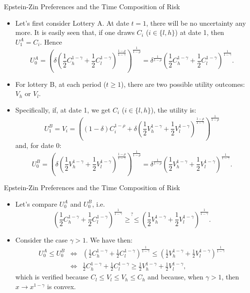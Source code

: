 \begin{frame}{Epstein-Zin Preferences and the Time Composition of Risk}
\begin{scriptsize}
\begin{itemize}
	\item Let's first consider Lottery A. At date $t=1$, there will be no uncertainty any more. It is easily seen that, if one draws $C_i$ ($i \in \{l,h\}$) at date 1, then $U_1^A = C_i$. Hence
	\begin{equation}\label{eq:U0A}
	U_0^A =  \left(\delta \left(\frac{1}{2}C_h^{1-\gamma}+\frac{1}{2}C_l^{1-\gamma}\right)^{\frac{1-\rho}{1-\gamma}}\right)^{\frac{1}{1-\rho}}= \delta^{\frac{1}{1-\rho}} \left(\frac{1}{2}C_h^{1-\gamma}+\frac{1}{2}C_l^{1-\gamma}\right)^{\frac{1}{1-\gamma}}.
	\end{equation}
	\item For lottery B, at each period ($t\ge1$), there are two possible utility outcomes: $V_h$ or $V_l$.
	\item Specifically, if, at date 1, we get $C_i$ ($i \in \{l,h\}$), the utility is:
	\begin{equation}\label{eq:ABCD}
	U_1^B = V_i = \left((1-\delta)C_i^{1-\rho} + \delta \left(\frac{1}{2}V_h^{1-\gamma}+\frac{1}{2}V_l^{1-\gamma}\right)^{\frac{1-\rho}{1-\gamma}}\right)^{\frac{1}{1-\rho}}
	\end{equation}
	and, for date 0:
	$$
	U_0^B =  \left(\delta \left(\frac{1}{2}V_h^{1-\gamma}+\frac{1}{2}V_l^{1-\gamma}\right)^{\frac{1-\rho}{1-\gamma}}\right)^{\frac{1}{1-\rho}}= \delta^{\frac{1}{1-\rho}}\left(\frac{1}{2}V_h^{1-\gamma}+\frac{1}{2}V_l^{1-\gamma}\right)^{\frac{1}{1-\gamma}}.
	$$
\end{itemize}
\end{scriptsize}
\end{frame}

\begin{frame}{Epstein-Zin Preferences and the Time Composition of Risk}
\begin{scriptsize}
\begin{itemize}
	\item Let's compare $U_0^A$ and $U_0^B$, i.e.
	$$
	\left(\frac{1}{2}C_h^{1-\gamma}+\frac{1}{2}C_l^{1-\gamma}\right)^{\frac{1}{1-\gamma}}
	\overset{?}{\ge \le}
	\left(\frac{1}{2}V_h^{1-\gamma}+\frac{1}{2}V_l^{1-\gamma}\right)^{\frac{1}{1-\gamma}}.
	$$
	\item Consider the case $\gamma > 1$. We have then:
	\begin{eqnarray*}
	U_0^A \le U_0^B &\Leftrightarrow& \left(\frac{1}{2}C_h^{1-\gamma}+\frac{1}{2}C_l^{1-\gamma}\right)^{\frac{1}{1-\gamma}} \le \left(\frac{1}{2}V_h^{1-\gamma}+\frac{1}{2}V_l^{1-\gamma}\right)^{\frac{1}{1-\gamma}}\\
	 &\Leftrightarrow& \frac{1}{2}C_h^{1-\gamma}+\frac{1}{2}C_l^{1-\gamma} \ge \frac{1}{2}V_h^{1-\gamma}+\frac{1}{2}V_l^{1-\gamma},
	\end{eqnarray*}
	which is verified because $C_l \le V_l \le V_h \le C_h$ and because, when $\gamma > 1$, then $x\rightarrow x^{1-\gamma}$ is convex.
\end{itemize}
\end{scriptsize}
\end{frame}




